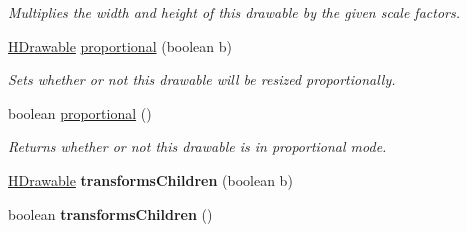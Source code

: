 \begin{DoxyCompactItemize}
\begin{DoxyCompactList}\small\item\em Multiplies the width and height of this drawable by the given scale factors. \end{DoxyCompactList}\item 
\hyperlink{classhype_1_1core_1_1drawable_1_1_h_drawable}{H\-Drawable} \hyperlink{classhype_1_1core_1_1drawable_1_1_h_drawable_ae4497942c7fbf1112bb8e557ec72aad8}{proportional} (boolean b)
\begin{DoxyCompactList}\small\item\em Sets whether or not this drawable will be resized proportionally. \end{DoxyCompactList}\item 
boolean \hyperlink{classhype_1_1core_1_1drawable_1_1_h_drawable_a220999f7d54e04a47ad0509d349a2bdd}{proportional} ()
\begin{DoxyCompactList}\small\item\em Returns whether or not this drawable is in proportional mode. \end{DoxyCompactList}\item 
\hypertarget{classhype_1_1core_1_1drawable_1_1_h_drawable_ad3732f860b758f7cdd3b054c6316bb63}{\hyperlink{classhype_1_1core_1_1drawable_1_1_h_drawable}{H\-Drawable} {\bfseries transforms\-Children} (boolean b)}\label{classhype_1_1core_1_1drawable_1_1_h_drawable_ad3732f860b758f7cdd3b054c6316bb63}

\item 
\hypertarget{classhype_1_1core_1_1drawable_1_1_h_drawable_a15ac4680ab74bf0204aaf6386745f5fd}{boolean {\bfseries transforms\-Children} ()}\label{classhype_1_1core_1_1drawable_1_1_h_drawable_a15ac4680ab74bf0204aaf6386745f5fd}


\end{DoxyCompactItemize}

